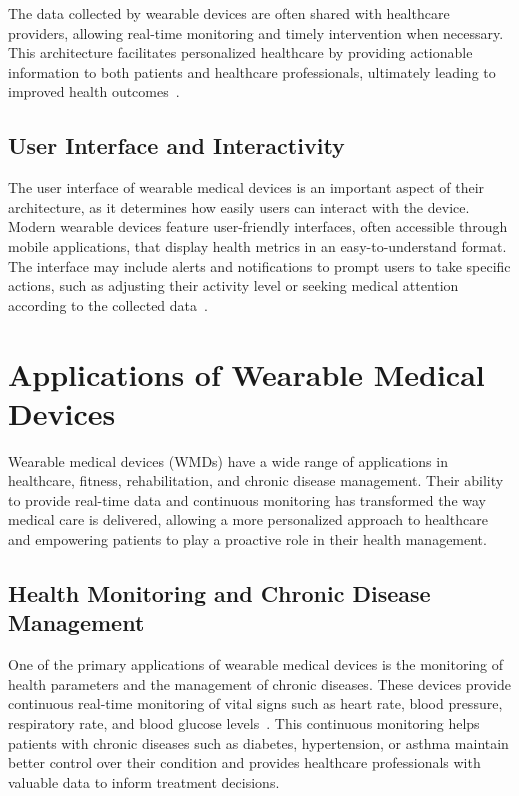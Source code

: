 \documentclass[journal]{IEEEtran}
\begin{document}
    The data collected by wearable devices are often shared with healthcare providers, allowing real-time monitoring and timely intervention when necessary. This architecture facilitates personalized healthcare by providing actionable information to both patients and healthcare professionals, ultimately leading to improved health outcomes~\cite{Guk2019}.

    \subsection{User Interface and Interactivity}
    The user interface of wearable medical devices is an important aspect of their architecture, as it determines how easily users can interact with the device. Modern wearable devices feature user-friendly interfaces, often accessible through mobile applications, that display health metrics in an easy-to-understand format. The interface may include alerts and notifications to prompt users to take specific actions, such as adjusting their activity level or seeking medical attention according to the collected data~\cite{Nahavandi2022}.


\section{Applications of Wearable Medical Devices}
\label{5.Applications}
Wearable medical devices (WMDs) have a wide range of applications in healthcare, fitness, rehabilitation, and chronic disease management. Their ability to provide real-time data and continuous monitoring has transformed the way medical care is delivered, allowing a more personalized approach to healthcare and empowering patients to play a proactive role in their health management.

    \subsection{Health Monitoring and Chronic Disease Management}

    One of the primary applications of wearable medical devices is the monitoring of health parameters and the management of chronic diseases. These devices provide continuous real-time monitoring of vital signs such as heart rate, blood pressure, respiratory rate, and blood glucose levels~\cite{Dias2018}. This continuous monitoring helps patients with chronic diseases such as diabetes, hypertension, or asthma maintain better control over their condition and provides healthcare professionals with valuable data to inform treatment decisions.
\end{document}
